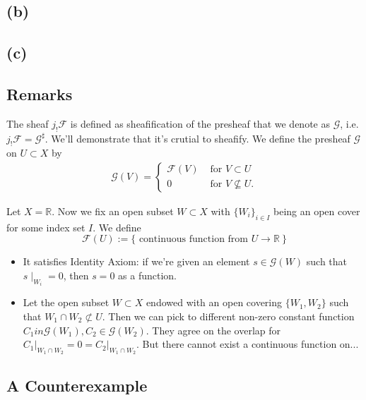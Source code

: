 \subsection{(b)}


\subsection{(c)}

\subsection{Remarks}

The sheaf $j_{!}\mathscr F$ is defined as sheafification of the presheaf that we denote as $\mathscr G$, i.e. $j_{!}\mathscr F=\mathscr G^{\sharp}$. We'll demonstrate that it's crutial to sheafify. We define the presheaf $\mathscr G$ on $U\subset X$ by 
\begin{align*}
    \mathscr G(V)=\begin{cases}
        \mathscr F(V) & \text{ for } V\subset U \\
        0 & \text{ for } V\not\subseteq U.
    \end{cases}
\end{align*}

Let $X=\mathbb R$. 
Now we fix an open subset $W\subset X$ with $\{W_i\}_{i\in I}$ being an open cover for some index set $I$. We define 
\[\mathscr F(U):=\{\text{ continuous function from } U\to \mathbb R~\}\]

\begin{itemize}
    \item It satisfies Identity Axiom: if we're given an element $s\in \mathscr G(W)$ such that $s\mid_{W_i}=0$, then $s=0$ as a function.
    \item Let the open subset $W\subset X$ endowed with an open covering $\{W_1,W_2\}$ such that $W_1\cap W_2\not\subset U$. Then we can pick to different non-zero constant function $C_1
    in\mathscr G(W_1),C_2\in\mathscr G(W_2)$. They agree on the overlap for $C_1\vert_{W_1\cap W_2}=0=C_2\vert_{W_1\cap W_2}$. But there cannot exist a continuous function on... 
\end{itemize}

\subsection{A Counterexample}

